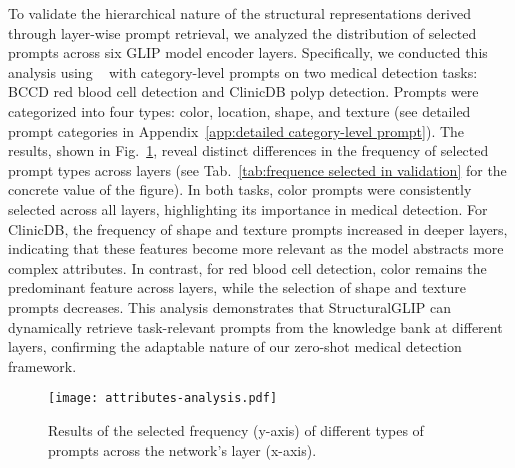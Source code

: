 To validate the hierarchical nature of the structural representations derived through layer-wise prompt retrieval, we analyzed the distribution of selected prompts across six GLIP model encoder layers. Specifically, we conducted this analysis using \ours~ with category-level prompts on two medical detection tasks: BCCD red blood cell detection and ClinicDB polyp detection. Prompts were categorized into four types: color, location, shape, and texture (see detailed prompt categories in Appendix~\ref{app:detailed category-level prompt}). The results, shown in Fig.~\ref{fig:strutural_analysis}, reveal distinct differences in the frequency of selected prompt types across layers (see Tab.~\ref{tab:frequence selected in validation} for the concrete value of the figure). In both tasks, color prompts were consistently selected across all layers, highlighting its importance in medical detection. For ClinicDB, the frequency of shape and texture prompts increased in deeper layers, indicating that these features become more relevant as the model abstracts more complex attributes. In contrast, for red blood cell detection, color remains the predominant feature across layers, while the selection of shape and texture prompts decreases.  This analysis demonstrates that StructuralGLIP can dynamically retrieve task-relevant prompts from the knowledge bank at different layers, confirming the adaptable nature of our zero-shot medical detection framework. 


\begin{figure}[ht]
  \centering
  \texttt{[image: attributes-analysis.pdf]}
  \caption{Results of the selected frequency (y-axis) of different types of prompts across the network's layer (x-axis).}
  \label{fig:strutural_analysis}
  \vspace{-10pt}
\end{figure}


